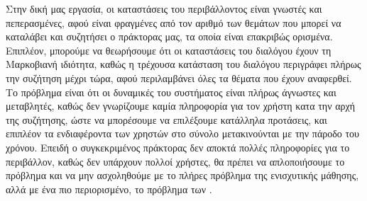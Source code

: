 Στην δική μας εργασία, οι καταστάσεις του περιβάλλοντος είναι γνωστές και πεπερασμένες, αφού είναι φραγμένες από τον αριθμό των θεμάτων που μπορεί
να καταλάβει και συζητήσει ο πράκτορας μας, τα οποία είναι επακριβώς ορισμένα. Επιπλέον, μπορούμε να θεωρήσουμε ότι οι καταστάσεις του διαλόγου
έχουν τη Μαρκοβιανή ιδιότητα, καθώς η τρέχουσα κατάσταση του διαλόγου περιγράφει πλήρως την συζήτηση μέχρι τώρα, αφού περιλαμβάνει όλες τα θέματα που έχουν
αναφερθεί. Το πρόβλημα είναι ότι οι δυναμικές του
συστήματος είναι πλήρως άγνωστες και μεταβλητές, καθώς δεν γνωρίζουμε καμία πληροφορία για τον χρήστη κατα την αρχή της συζήτησης, ώστε να μπορέσουμε
να επιλέξουμε κατάλληλα προτάσεις, και επιπλέον τα ενδιαφέροντα των χρηστών στο σύνολο μετακινούνται με την πάροδο του χρόνου. Επειδή ο συγκεκριμένος
πράκτορας δεν αποκτά πολλές πληροφορίες για το περιβάλλον, καθώς δεν υπάρχουν πολλοί χρήστες, θα πρέπει να απλοποιήσουμε το πρόβλημα και να μην
ασχοληθούμε με το πλήρες πρόβλημα της ενισχυτικής μάθησης, αλλά με ένα πιο περιορισμένο, το πρόβλημα των .
